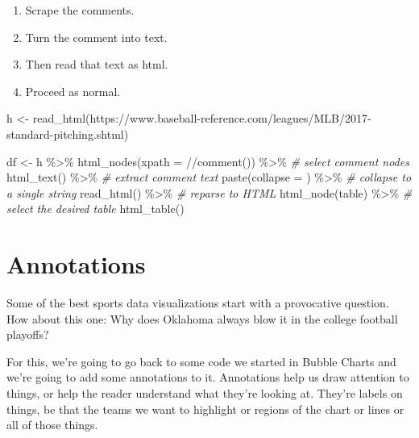 \documentclass[
]{book}
\newenvironment{Shaded}{\begin{snugshade}}{\end{snugshade}}
\newcommand{\AttributeTok}[1]{\textcolor[rgb]{0.77,0.63,0.00}{#1}}
\newcommand{\CommentTok}[1]{\textcolor[rgb]{0.56,0.35,0.01}{\textit{#1}}}
\newcommand{\FunctionTok}[1]{\textcolor[rgb]{0.00,0.00,0.00}{#1}}
\newcommand{\NormalTok}[1]{#1}
\newcommand{\OtherTok}[1]{\textcolor[rgb]{0.56,0.35,0.01}{#1}}
\newcommand{\SpecialCharTok}[1]{\textcolor[rgb]{0.00,0.00,0.00}{#1}}
\newcommand{\StringTok}[1]{\textcolor[rgb]{0.31,0.60,0.02}{#1}}
\providecommand{\tightlist}{%
  \setlength{\itemsep}{0pt}\setlength{\parskip}{0pt}}
\begin{document}
\begin{enumerate}
\def\labelenumi{\arabic{enumi}.}
\tightlist
\item
  Scrape the comments.
\item
  Turn the comment into text.
\item
  Then read that text as html.
\item
  Proceed as normal.
\end{enumerate}

\begin{Shaded}
\begin{Highlighting}[]
\NormalTok{h }\OtherTok{\textless{}{-}} \FunctionTok{read\_html}\NormalTok{(}\StringTok{\textquotesingle{}https://www.baseball{-}reference.com/leagues/MLB/2017{-}standard{-}pitching.shtml\textquotesingle{}}\NormalTok{)}

\NormalTok{df }\OtherTok{\textless{}{-}}\NormalTok{ h }\SpecialCharTok{\%\textgreater{}\%} \FunctionTok{html\_nodes}\NormalTok{(}\AttributeTok{xpath =} \StringTok{\textquotesingle{}//comment()\textquotesingle{}}\NormalTok{) }\SpecialCharTok{\%\textgreater{}\%}    \CommentTok{\# select comment nodes}
    \FunctionTok{html\_text}\NormalTok{() }\SpecialCharTok{\%\textgreater{}\%}    \CommentTok{\# extract comment text}
    \FunctionTok{paste}\NormalTok{(}\AttributeTok{collapse =} \StringTok{\textquotesingle{}\textquotesingle{}}\NormalTok{) }\SpecialCharTok{\%\textgreater{}\%}    \CommentTok{\# collapse to a single string}
    \FunctionTok{read\_html}\NormalTok{() }\SpecialCharTok{\%\textgreater{}\%}    \CommentTok{\# reparse to HTML}
    \FunctionTok{html\_node}\NormalTok{(}\StringTok{\textquotesingle{}table\textquotesingle{}}\NormalTok{) }\SpecialCharTok{\%\textgreater{}\%}    \CommentTok{\# select the desired table}
    \FunctionTok{html\_table}\NormalTok{() }
\end{Highlighting}
\end{Shaded}

\hypertarget{annotations}{%
\chapter{Annotations}\label{annotations}}

Some of the best sports data visualizations start with a provocative question. How about this one: Why does Oklahoma always blow it in the college football playoffs?

For this, we're going to go back to some code we started in Bubble Charts and we're going to add some annotations to it. Annotations help us draw attention to things, or help the reader understand what they're looking at. They're labels on things, be that the teams we want to highlight or regions of the chart or lines or all of those things.
\end{document}
